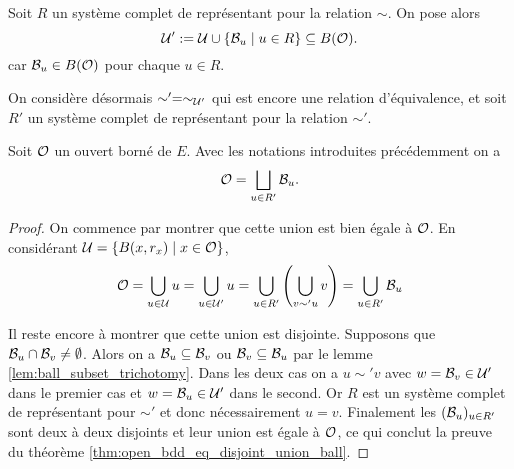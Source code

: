 \documentclass[../../rapport.tex]{subfiles}
\begin{document}
  \begin{definition}
    Soit $R$ un système complet de représentant pour la relation $\sim$.
    On pose alors
    $$\mathcal U' := \mathcal U \cup \left\{\mathcal{B}_u \mid u \in R\right\} \subseteq B(\mathcal{O}).$$
    car $\mathcal{B}_u \in B(\mathcal{O})$ pour chaque $u \in R$.
  \end{definition}

  On considère désormais $\sim' = \sim_{\mathcal U'}$ qui est encore une relation d'équivalence,
  et soit $R'$ un système complet de représentant pour la relation $\sim'$.

  \begin{theorem}
    Soit $\mathcal{O}$ un ouvert borné de $E$. Avec les notations introduites précédemment on a
    $$\mathcal{O} = \bigsqcup_{u\in R'}{\mathcal{B}_u}.$$
  \end{theorem}

  \begin{proof}
    On commence par montrer que cette union est bien égale à $\mathcal{O}$.
    En considérant $\mathcal U = \left\{B(x, r_x) \mid x \in \mathcal{O}\right\}$,
    \begin{align*}
      \mathcal{O} = \bigcup_{u \in \mathcal U}{u} = \bigcup_{u \in \mathcal U'}{u} = \bigcup_{u\in R'}{\left(\bigcup_{v \sim' u}{v}\right)}
				= \bigcup_{u\in R'}{\mathcal{B}_u}
    \end{align*}

    Il reste encore à montrer que cette union est disjointe.
    Supposons que $\mathcal{B}_u \cap \mathcal{B}_v \not= \emptyset$.
    Alors on a $\mathcal{B}_u \subseteq \mathcal{B}_v$ ou $\mathcal{B}_v \subseteq \mathcal{B}_u$ par le lemme \ref{lem:ball_subset_trichotomy}.
    Dans les deux cas on a $u \sim' v$ avec $w = \mathcal{B}_v \in \mathcal U'$ dans le premier cas et $w = \mathcal{B}_u \in \mathcal U'$ dans le second.
    Or $R$ est un système complet de représentant pour $\sim'$ et donc nécessairement $u = v$.
    Finalement les $(\mathcal{B}_u)_{u\in R'}$ sont deux à deux disjoints et leur union est égale à $\mathcal{O}$,
    ce qui conclut la preuve du théorème \ref{thm:open_bdd_eq_disjoint_union_ball}.
  \end{proof}
\end{document}
